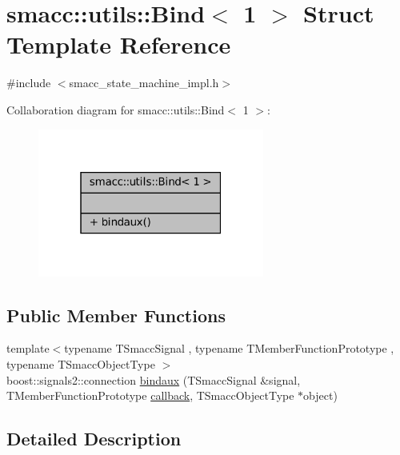 \hypertarget{structsmacc_1_1utils_1_1Bind_3_011_01_4}{}\section{smacc\+:\+:utils\+:\+:Bind$<$ 1 $>$ Struct Template Reference}
\label{structsmacc_1_1utils_1_1Bind_3_011_01_4}


{\ttfamily \#include $<$smacc\+\_\+state\+\_\+machine\+\_\+impl.\+h$>$}



Collaboration diagram for smacc\+:\+:utils\+:\+:Bind$<$ 1 $>$\+:
\nopagebreak
\begin{figure}[H]
\begin{center}
\leavevmode
\includegraphics[width=211pt]{structsmacc_1_1utils_1_1Bind_3_011_01_4__coll__graph}
\end{center}
\end{figure}
\subsection*{Public Member Functions}
\begin{DoxyCompactItemize}
\item 
{\footnotesize template$<$typename T\+Smacc\+Signal , typename T\+Member\+Function\+Prototype , typename T\+Smacc\+Object\+Type $>$ }\\boost\+::signals2\+::connection \hyperlink{structsmacc_1_1utils_1_1Bind_3_011_01_4_a5704d3cff0b914fc899ff385ff8f8bc2}{bindaux} (T\+Smacc\+Signal \&signal, T\+Member\+Function\+Prototype \hyperlink{sm__ridgeback__barrel__search__2_2servers_2opencv__perception__node_2opencv__perception__node_8cpp_a050e697bd654facce10ea3f6549669b3}{callback}, T\+Smacc\+Object\+Type $\ast$object)
\end{DoxyCompactItemize}


\subsection{Detailed Description}
